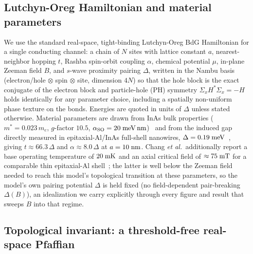 \documentclass[aps,physrev,reprint,superscriptaddress,amsmath,amssymb,floatfix]{revtex4-2}
\begin{document}
\subsection{Lutchyn-Oreg Hamiltonian and material parameters}

We use the standard real-space, tight-binding Lutchyn-Oreg BdG Hamiltonian
for a single conducting channel: a chain of $N$ sites with lattice
constant $a$, nearest-neighbor hopping $t$, Rashba spin-orbit coupling
$\alpha$, chemical potential $\mu$, in-plane Zeeman field $B$, and
$s$-wave proximity pairing $\Delta$, written in the Nambu basis
(electron/hole $\otimes$ spin $\otimes$ site, dimension $4N$) so that the
hole block is the exact conjugate of the electron block and
particle-hole (PH) symmetry $\Sigma_x H^* \Sigma_x = -H$ holds identically
for any parameter choice, including a spatially non-uniform phase
texture on the bonds. Energies are quoted in units of $\Delta$ unless
stated otherwise. Material parameters are drawn from InAs bulk properties
($m^*=0.023\,m_e$, $g$-factor $10.5$, $\alpha_{\rm SO}=20\;{\rm
meV\,nm}$)~\cite{oreg2010,lutchyn2010} and from the induced gap directly
measured in epitaxial-Al/InAs full-shell nanowires, $\Delta=0.19\;{\rm
meV}$~\cite{chang2015}, giving $t\approx 66.3\,\Delta$ and
$\alpha\approx8.0\,\Delta$ at $a=10\;{\rm nm}$. Chang \emph{et
al.}\ additionally report a base operating temperature of $20\;{\rm mK}$
and an axial critical field of $\approx75\;{\rm mT}$ for a comparable
thin epitaxial-Al shell~\cite{chang2015}; the latter is well below the
Zeeman field needed to reach this model's topological transition at
these parameters, so the model's own pairing potential $\Delta$ is held
fixed (no field-dependent pair-breaking $\Delta(B)$), an idealization we
carry explicitly through every figure and result that sweeps $B$ into
that regime.

\subsection{Topological invariant: a threshold-free real-space Pfaffian}
\end{document}
